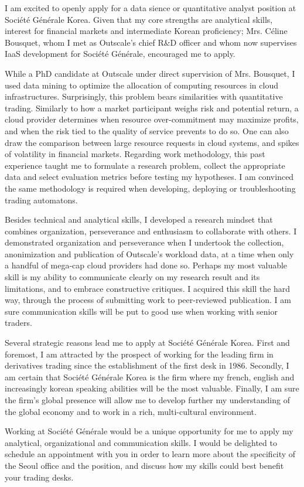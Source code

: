 I am excited to openly apply for a data sience or quantitative analyst position at Société Générale Korea. 
Given that my core strengths are analytical skills, interest for financial markets and intermediate Korean proficiency; Mrs. Céline Bousquet, whom I met as Outscale's chief R\&D officer and whom now supervises IaaS development for Société Générale, encouraged me to apply. 

While a PhD candidate at Outscale under direct supervision of Mrs. Bousquet, I used data mining to optimize the allocation of computing resources in cloud infrastructures. 
Surprisingly, this problem bears similarities with quantitative trading.  
Similarly to how a market participant weighs risk and potential return, a cloud provider determines when resource over-commitment may maximize profits, and when the risk tied to the quality of service prevents to do so. One can also draw the comparison between large resource requests in cloud systems, and spikes of volatility in financial markets. Regarding work methodology, this past experience taught me to formulate a research problem, collect the appropriate data and select evaluation metrics before testing my hypotheses. I am convinced the same methodology is required when developing, deploying or troubleshooting trading automatons. 

Besides technical and analytical skills, I developed a research mindset that combines organization, perseverance and enthusiasm to collaborate with others. 
I demonstrated organization and perseverance when I undertook the collection, anonimization and publication of Outscale's workload data, at a time when only a handful of mega-cap cloud providers had done so. 
Perhaps my most valuable skill is my ability to communicate clearly on my research result and its limitations, and to embrace constructive critiques. 
I acquired this skill the hard way, through the process of submitting work to peer-reviewed publication. I am sure communication skills will be put to good use when working with senior traders. 

Several strategic reasons lead me to apply at Société Générale Korea.   
First and foremost, I am attracted by the prospect of working for the leading firm in derivatives trading since the establishment of the first desk in 1986. 
Secondly, I am certain that Société Générale Korea is the firm where my french, english and increasingly korean speaking abilities will be the most valuable. 
Finally, I am sure the firm's global presence will allow me to develop further my understanding of the global economy and to work in a rich, multi-cultural environment. 

Working at Société Générale would be a unique opportunity for me to apply my analytical, organizational and communication skills. 
I would be delighted to schedule an appointment with you in order to learn more about the specificity of the Seoul office and the position, and discuss how my skills could best benefit your trading desks.

